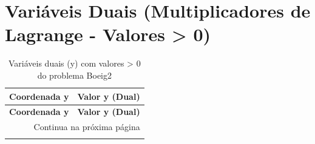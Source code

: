 \documentclass[12pt]{article}
\begin{document}
\section{Variáveis Duais (Multiplicadores de Lagrange - Valores > 0)}

\begin{longtable}{@{}cc@{}}
\caption{Variáveis duais (y) com valores > 0 do problema Boeig2} \\
\toprule
\textbf{Coordenada y} & \textbf{Valor y (Dual)} \\
\midrule
\endfirsthead

\toprule
\textbf{Coordenada y} & \textbf{Valor y (Dual)} \\
\midrule
\endhead

\midrule \multicolumn{2}{r}{{Continua na próxima página}} \\ \midrule
\endfoot


\end{longtable}
\end{document}
